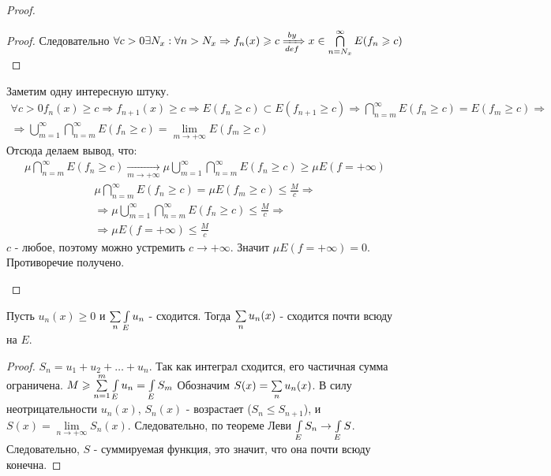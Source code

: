 \begin{proof}
\begin{enumerate}
\begin{proof}
				Следовательно $\forall c > 0 \exists N_x : \forall n > N_x \Rightarrow f_n(x) \geqslant c \xRightarrow[def]{by} 
				x \in \bigcap\limits_{n = N_x}^{\infty} E(f_n \geqslant c)$
			\end{proof}
			Заметим одну интересную штуку. 
			\begin{gather*}
				\forall c > 0 f_n(x) \geqslant c \Rightarrow f_{n + 1}(x) \geqslant c \Rightarrow 
				E(f_n \geqslant c) \subset E(f_{n + 1} \geqslant c) \Rightarrow \bigcap\limits_{n = m}^{\infty} E(f_n \geqslant c) = E(f_m \geqslant c)
				\Rightarrow \\
				\Rightarrow \bigcup\limits_{m = 1}^{\infty} \bigcap\limits_{n = m}^{\infty} E(f_n \geqslant c) = 
				\lim\limits_{m \rightarrow +\infty} E(f_m \geqslant c)
			\end{gather*}
			Отсюда делаем вывод, что: 
			\begin{gather*}
				\mu \bigcap\limits_{n = m}^{\infty} E(f_n \geqslant c) \xrightarrow[m \rightarrow +\infty]{} 
				\mu \bigcup\limits_{m = 1}^{\infty} \bigcap\limits_{n = m}^{\infty} E(f_n \geqslant c) \geqslant
				\mu E(f = +\infty)
			\end{gather*}
			\newpage
			\begin{gather*}
				\mu \bigcap\limits_{n = m}^{\infty} E(f_n \geqslant c) = \mu E(f_m \geqslant c) \leqslant \frac{M}{c} \Rightarrow \\
				\Rightarrow \mu \bigcup\limits_{m = 1}^{\infty} \bigcap\limits_{n = m}^{\infty} E(f_n \geqslant c) \leqslant \frac{M}{c} \Rightarrow \\
				\Rightarrow \mu E(f = +\infty) \leqslant \frac{M}{c}
			\end{gather*}
			$c$ - любое, поэтому можно устремить $c \rightarrow +\infty$. Значит $\mu E(f = +\infty) = 0$. Противоречие получено.
	\end{enumerate}
\end{proof}

\begin{corollary}
	Пусть $u_n(x) \geqslant 0$ и $\sum\limits_{n}\int\limits_{E}u_n$ - сходится. Тогда $\sum\limits_{n}u_n(x)$ - сходится почти всюду на $E$.
\end{corollary}

\begin{proof}
	$S_n = u_1 + u_2 + \dots + u_n$. Так как интеграл сходится, его частичная сумма ограничена. $M \geqslant \sum\limits_{n = 1}^{m}\int\limits_{E} u_n = \int\limits_{E} S_m$		
	Обозначим $S(x) = \sum\limits_{n} u_n(x)$. В силу неотрицательности $u_n(x)$, $S_n(x)$ - возрастает ($S_n \leqslant S_{n + 1}$), и 
	$S(x) = \lim\limits_{n \rightarrow +\infty} S_n(x)$. Следовательно, по теореме Леви $\int\limits_{E} S_n \rightarrow \int\limits_{E} S$. Следовательно, $S$ - суммируемая функция, это значит, что она почти всюду конечна. 
\end{proof}

